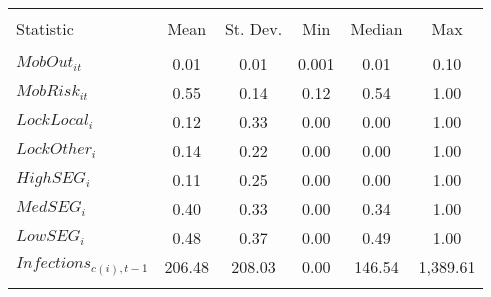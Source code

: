 
\begin{tabular}{@{\extracolsep{5pt}}lccccc} 
\\[-1.8ex]\hline 
\hline \\[-1.8ex] 
Statistic & \multicolumn{1}{c}{Mean} & \multicolumn{1}{c}{St. Dev.} & \multicolumn{1}{c}{Min} & \multicolumn{1}{c}{Median} & \multicolumn{1}{c}{Max} \\ 
\hline \\[-1.8ex] 
$MobOut_{it}$ & 0.01 & 0.01 & 0.001 & 0.01 & 0.10 \\ 
$MobRisk_{it}$ & 0.55 & 0.14 & 0.12 & 0.54 & 1.00 \\ 
$LockLocal_{i}$ & 0.12 & 0.33 & 0.00 & 0.00 & 1.00 \\ 
$LockOther_{i}$ & 0.14 & 0.22 & 0.00 & 0.00 & 1.00 \\ 
$HighSEG_i$ & 0.11 & 0.25 & 0.00 & 0.00 & 1.00 \\ 
$MedSEG_i$ & 0.40 & 0.33 & 0.00 & 0.34 & 1.00 \\ 
$LowSEG_i$ & 0.48 & 0.37 & 0.00 & 0.49 & 1.00 \\ 
$Infections_{c(i),t-1}$ & 206.48 & 208.03 & 0.00 & 146.54 & 1,389.61 \\ 
\hline \\[-1.8ex] 
\end{tabular} 